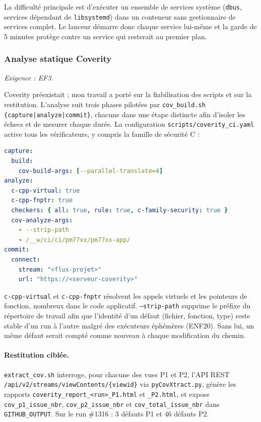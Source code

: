 La difficulté principale est d'exécuter un ensemble de services système
(\texttt{dbus}, services dépendant de \texttt{libsystemd}) dans un conteneur sans
gestionnaire de services complet. Le lanceur démarre donc chaque service
lui-même et la garde de 5 minutes protège contre un service qui resterait au
premier plan.

\subsubsection{Analyse statique Coverity}
\label{ssec:impl-coverity}

\emph{Exigence : EF3.}

Coverity préexistait ; mon travail a porté sur la fiabilisation des scripts et
sur la restitution. L'analyse suit trois phases pilotées par
\texttt{cov\_build.sh \{capture|analyze|commit\}}, chacune dans une étape
distincte afin d'isoler les échecs et de mesurer chaque durée. La configuration
\texttt{scripts/coverity\_ci.yaml} active tous les vérificateurs, y compris la
famille de sécurité C :

\begin{lstlisting}[language=yaml,caption={Configuration Coverity},label={lst:impl-cov-config}]
capture:
  build:
    cov-build-args: [--parallel-translate=4]
analyze:
  c-cpp-virtual: true
  c-cpp-fnptr: true
  checkers: { all: true, rule: true, c-family-security: true }
  cov-analyze-args:
    - --strip-path
    - /__w/ci/ci/pm77xx/pm77xx-app/
commit:
  connect:
    stream: "<flux-projet>"
    url: "https://<serveur-coverity>"
\end{lstlisting}

\texttt{c-cpp-virtual} et \texttt{c-cpp-fnptr} résolvent les appels virtuels
et les pointeurs de fonction, nombreux dans le code applicatif.
\texttt{--strip-path} supprime le préfixe du répertoire de travail afin que
l'identité d'un défaut (fichier, fonction, type) reste stable d'un run à l'autre
malgré des exécuteurs éphémères (ENF20). Sans lui, un même défaut serait
compté comme nouveau à chaque modification du chemin.

\paragraph{Restitution ciblée.} \texttt{extract\_cov.sh} interroge, pour chacune
des vues P1 et P2, l'API REST
\texttt{/api/v2/streams/viewContents/\{viewid\}} via \texttt{pyCovXtract.py},
génère les rapports \texttt{coverity\_report\_<run>\_P1.html} et
\texttt{\_P2.html}, et expose \texttt{cov\_p1\_issue\_nbr},
\texttt{cov\_p2\_issue\_nbr} et \texttt{cov\_total\_issue\_nbr} dans
\texttt{GITHUB\_OUTPUT}. Sur le run \#1316 : 3 défauts P1 et 46 défauts P2.

